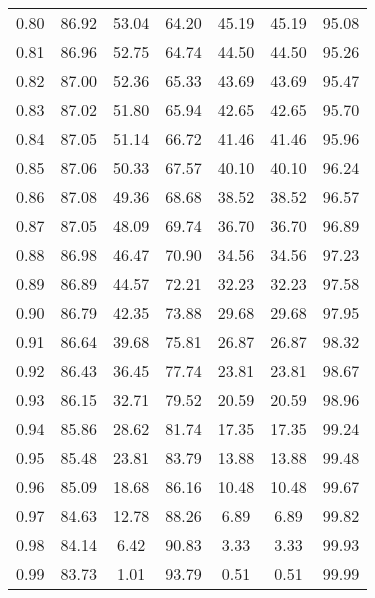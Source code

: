 \begin{tabular}{|c|c|c|c|c|c|c|}
      0.80 &     86.92 &     53.04 &      64.20 &   45.19 &      45.19 &         95.08 \\
      0.81 &     86.96 &     52.75 &      64.74 &   44.50 &      44.50 &         95.26 \\
      0.82 &     87.00 &     52.36 &      65.33 &   43.69 &      43.69 &         95.47 \\
      0.83 &     87.02 &     51.80 &      65.94 &   42.65 &      42.65 &         95.70 \\
      0.84 &     87.05 &     51.14 &      66.72 &   41.46 &      41.46 &         95.96 \\
      0.85 &     87.06 &     50.33 &      67.57 &   40.10 &      40.10 &         96.24 \\
      0.86 &     87.08 &     49.36 &      68.68 &   38.52 &      38.52 &         96.57 \\
      0.87 &     87.05 &     48.09 &      69.74 &   36.70 &      36.70 &         96.89 \\
      0.88 &     86.98 &     46.47 &      70.90 &   34.56 &      34.56 &         97.23 \\
      0.89 &     86.89 &     44.57 &      72.21 &   32.23 &      32.23 &         97.58 \\
      0.90 &     86.79 &     42.35 &      73.88 &   29.68 &      29.68 &         97.95 \\
      0.91 &     86.64 &     39.68 &      75.81 &   26.87 &      26.87 &         98.32 \\
      0.92 &     86.43 &     36.45 &      77.74 &   23.81 &      23.81 &         98.67 \\
      0.93 &     86.15 &     32.71 &      79.52 &   20.59 &      20.59 &         98.96 \\
      0.94 &     85.86 &     28.62 &      81.74 &   17.35 &      17.35 &         99.24 \\
      0.95 &     85.48 &     23.81 &      83.79 &   13.88 &      13.88 &         99.48 \\
      0.96 &     85.09 &     18.68 &      86.16 &   10.48 &      10.48 &         99.67 \\
      0.97 &     84.63 &     12.78 &      88.26 &    6.89 &       6.89 &         99.82 \\
      0.98 &     84.14 &      6.42 &      90.83 &    3.33 &       3.33 &         99.93 \\
      0.99 &     83.73 &      1.01 &      93.79 &    0.51 &       0.51 &         99.99 \\
\bottomrule
\end{tabular}

